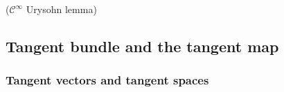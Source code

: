 \documentclass{article}
\begin{document}
\begin{definition}
\end{definition}

\begin{proposition}[]
\end{proposition}

\begin{proposition}
\end{proposition}

\begin{definition}
\end{definition}

\begin{proposition}
\end{proposition}

\begin{theorem}
\end{theorem}

\begin{definition}
\end{definition}


\begin{corollary}($\mathcal{C}^{\infty}$ Urysohn lemma)
\end{corollary}

\begin{corollary}
\end{corollary}


\subsection{Tangent bundle and the tangent map}

\subsubsection{Tangent vectors and tangent spaces}

\begin{definition}[Germ]
\end{definition}

\begin{proposition}
\end{proposition}

\begin{definition}
\end{definition}

\begin{theorem}
\end{theorem}
\end{document}
